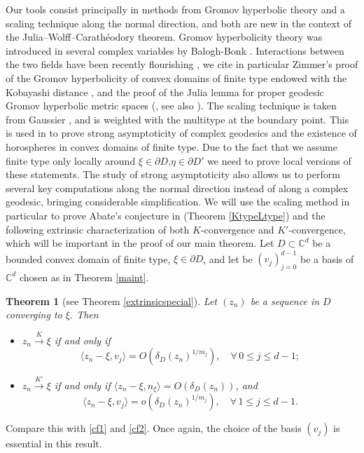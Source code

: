 \documentclass[11pt, reqno]{amsart}
\numberwithin{equation}{section}
\newtheorem{theorem}{Theorem}[section]
\theoremstyle{definition}
\newcommand{\C}{\mathbb{C}}
\begin{document}
	Our tools consist principally in  methods from Gromov hyperbolic theory and 
	a scaling technique along the normal direction, and both are new in the context of the Julia--Wolff--Carath\'eodory theorem. Gromov hyperbolicity theory was introduced in several complex variables by Balogh-Bonk \cite{BaBo}. Interactions between the two fields have been recently flourishing \cite{GS,BZ,Zimsub,BGZ,BNT,Fia,ADAF}, we cite in particular Zimmer's proof of the Gromov hyperbolicity of convex domains of finite type endowed with the Kobayashi distance \cite{Zim}, and the proof of the Julia lemma for proper geodesic Gromov hyperbolic metric spaces (\cite{AFGG}, see also \cite{AFGK}).
	The scaling technique is taken from Gaussier \cite{Gauss}, and is weighted with the multitype at the boundary point. 
	This is used in \cite{AFGG} to prove strong asymptoticity of complex geodesics and the existence of horospheres in convex domains of finite type. Due to the fact that we assume finite type only locally around $\xi\in \partial D$,$\eta\in \partial D'$ we  need to prove local versions of these statements. The study of strong asymptoticity  also allows us to perform several key computations along the normal direction instead of along a complex geodesic, bringing considerable  simplification.
	We will use the scaling method in particular to prove Abate's conjecture in \cite{Absurv} (Theorem \ref{KtypeLtype}) and the following extrinsic characterization of both $K$-convergence and $K'$-convergence, which will be important in the proof of our main theorem. Let $D\subset\C^d$ be a bounded convex domain of finite type, $\xi\in\partial D$, and let be $(v_j)_{j=0}^{d-1}$ be a  basis of $\C^d$ chosen as in Theorem \ref{maint}.
	\begin{theorem}[see Theorem \ref{extrinsicspecial}]
		Let $(z_n)$ be a sequence in $D$ converging to $\xi$. Then 
		\begin{itemize}
			\item[(i)]$z_n\stackrel{K}\to \xi$  if and only if 
			$$
			\langle z_n-\xi,v_j\rangle=O\left(\delta_D(z_n)^{1/m_j}\right) ,\quad \forall\, 0\leq j\leq d-1 ;
			$$
			\item[(ii)]
			$z_n\stackrel{K'}\to \xi$ if and only if 
			$\langle z_n-\xi,n_\xi\rangle=O(\delta_D(z_n))$, and
			$$
			\langle z_n-\xi,v_j\rangle=o\left(\delta_D(z_n)^{1/m_j}\right),\quad \forall\, 1\leq j\leq d-1.
			$$
		\end{itemize}
		
	\end{theorem}
	Compare this with \eqref{cf1} and \eqref{cf2}.
	Once again, the choice of the basis $(v_j)$ is essential in this result.
	
\end{document}
